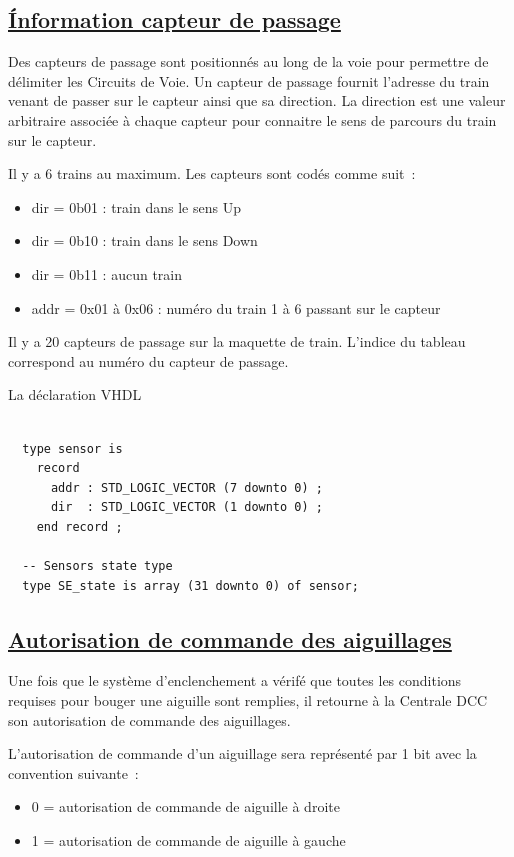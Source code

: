 \subsection{\underline{\'Information capteur de passage}}
\label{sec:ixl_cdv}

Des capteurs de passage sont positionnés au long de la voie pour 
permettre de délimiter les Circuits de Voie. Un capteur de passage
fournit l'adresse du train venant de passer sur le capteur ainsi que
sa direction. La direction est une valeur arbitraire associée à 
chaque capteur pour connaitre le sens de parcours du train sur le capteur.


Il y a 6 trains au maximum. Les capteurs sont codés comme suit~:
\begin{itemize}
  \item dir = 0b01 : train dans le sens Up
  \item dir = 0b10 : train dans le sens Down
  \item dir = 0b11 : aucun train
  \item addr = 0x01 à 0x06 : numéro du train 1 à 6 passant sur le capteur
\end{itemize}  

Il y a 20 capteurs de passage sur la maquette de train. L'indice du
tableau correspond au numéro du capteur de passage.

\medskip
La déclaration VHDL
\begin{lstlisting}[style=vhdl]

  type sensor is
    record
      addr : STD_LOGIC_VECTOR (7 downto 0) ;
      dir  : STD_LOGIC_VECTOR (1 downto 0) ;
    end record ;

  -- Sensors state type
  type SE_state is array (31 downto 0) of sensor;

\end{lstlisting}


\subsection{\underline{Autorisation de commande des aiguillages}}
\label{sec:ixl_dem_aig}

Une fois que le système d'enclenchement a vérifé que toutes les
conditions requises pour bouger une aiguille sont remplies, il 
retourne à la Centrale DCC son autorisation de commande des aiguillages.

L'autorisation de commande d'un aiguillage sera représenté par
1 bit avec la convention suivante~:
\begin{itemize}
\item 0 = autorisation de commande de aiguille à droite
\item 1 = autorisation de commande de aiguille à gauche
\end{itemize}
 
